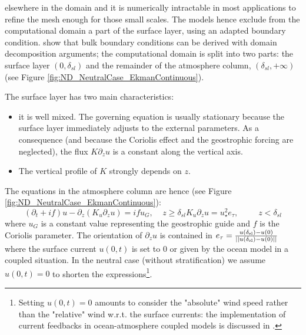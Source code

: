 elsewhere in the domain and it is numerically
intractable in most applications
to refine the mesh enough for those small scales.
The models hence exclude from the computational domain
a part of the surface layer, using an adapted boundary
condition.
\cite{mohammadi_rough_1998} show that bulk boundary
conditions can be derived with domain decomposition arguments;
the computational domain is split into two parts:
the surface layer $(0,\delta_{sl})$ and the remainder of
the atmosphere column, $(\delta_{sl}, +\infty)$
(see Figure \ref{fig:ND_NeutralCase_EkmanContinuous}).
%
\par
The surface layer has two main characteristics:
\begin{itemize}
	\item it is well mixed. The governing equation
		is usually stationary because the surface layer
		immediately adjusts to the external parameters.
		As a consequence (and because the Coriolis effect
		and the geostrophic forcing are neglected),
		the flux $K \partial_z u$
		is a constant along the vertical axis.
	\item The vertical profile of $K$ strongly depends 
		on $z$.
\end{itemize}
The equations in the atmosphere column are hence (see Figure
\ref{fig:ND_NeutralCase_EkmanContinuous}):
\begin{subequations}
	\label{eq:ND_NeutralCase_continuousModel}
	\begin{equation}
	\label{eq:ND_NeutralCase_EkmanEq}
  (\partial_t + if) u - \partial_z (K_u \partial_z u) = if u_G
		,~~~~~ z \geq \delta_{sl}
	\end{equation}
	\begin{equation}
	\label{eq:ND_NeutralCase_ConstantFlux}
	K_u \partial_z u
	= u_\star^2
	e_\tau, ~~~~~~~~~~~ z < \delta_{sl}
	\end{equation}
\end{subequations}
where $u_G$ is a constant value representing the geostrophic guide and
$f$ is the Coriolis parameter.
The orientation of $\partial_z u$ is contained in
$e_\tau = \frac{u(\delta_{\rm sl})-u(0)}
	{||u(\delta_{\rm sl})-u(0)||}$
where the surface current $u(0, t)$ is set to 0 or given by
the ocean model in a coupled situation.
In the neutral case (without stratification) we assume
$u(0,t)=0$ to shorten the
expressions\footnote{
Setting $u(0,t)=0$ amounts to consider the "absolute" wind speed
rather than the "relative" wind w.r.t. the surface currents:
the implementation of current feedbacks in ocean-atmosphere
coupled models is discussed in \cite{renault_implementation_2019}.
}.
